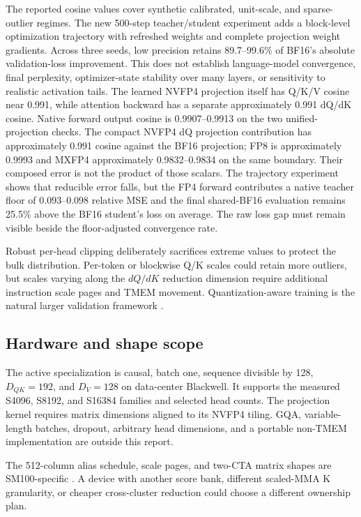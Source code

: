 The reported cosine values cover synthetic calibrated, unit-scale, and
sparse-outlier regimes.  The new 500-step teacher/student experiment adds a
block-level optimization trajectory with refreshed weights and complete
projection weight gradients.  Across three seeds, low precision retains
89.7--99.6\% of BF16's absolute validation-loss improvement.  This does not
establish language-model convergence, final perplexity, optimizer-state
stability over many layers, or sensitivity to realistic activation tails.
The learned NVFP4 projection itself has Q/K/V cosine near 0.991, while
attention backward has a separate approximately 0.991 dQ/dK cosine.  Native
forward output cosine is 0.9907--0.9913 on the two unified-projection checks.
The compact NVFP4 dQ projection contribution has approximately 0.991 cosine
against the BF16 projection; FP8 is approximately 0.9993 and MXFP4
approximately 0.9832--0.9834 on the same boundary.
Their composed error is not the product of those scalars.  The trajectory
experiment shows that reducible error falls, but the FP4 forward contributes
a native teacher floor of 0.093--0.098 relative MSE and the final shared-BF16
evaluation remains 25.5\% above the BF16 student's loss on average.  The raw
loss gap must remain visible beside the floor-adjusted convergence rate.

Robust per-head clipping deliberately sacrifices extreme values to protect
the bulk distribution.  Per-token or blockwise Q/K scales could retain more
outliers, but scales varying along the $dQ/dK$ reduction dimension require
additional instruction scale pages and TMEM movement.  Quantization-aware
training is the natural larger validation framework
\cite{zhang2026attnqat}.

\subsection{Hardware and shape scope}

The active specialization is causal, batch one, sequence divisible by 128,
$D_{QK}=192$, and $D_V=128$ on data-center Blackwell.  It supports the
measured S4096, S8192, and S16384 families and selected head counts.  The
projection kernel requires matrix dimensions aligned to its NVFP4 tiling.
GQA, variable-length batches, dropout, arbitrary head dimensions, and a
portable non-TMEM implementation are outside this report.

The 512-column alias schedule, \tcgen{} scale pages, and two-CTA matrix shapes
are SM100-specific \cite{nvidia2026ptx}.  A device with another score bank,
different scaled-MMA K granularity, or cheaper cross-cluster reduction could
choose a different ownership plan.

